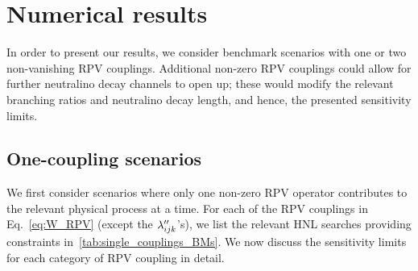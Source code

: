 \section{Numerical results}\label{sec:results}
In order to present our results, we consider benchmark scenarios with one or two non-vanishing RPV 
couplings. Additional non-zero RPV couplings could allow for further neutralino decay channels to 
open up; these would modify the relevant branching ratios and neutralino decay length, and hence, 
the presented sensitivity limits.



\subsection{One-coupling scenarios}
%
We first consider scenarios where only one non-zero RPV operator contributes to the relevant 
physical process at a time. For each of the RPV couplings in Eq.~\eqref{eq:W_RPV} (except the $\lambda''
_{ijk}$'s), we list the relevant HNL searches providing constraints in~\cref{tab:single_couplings_BMs}.
We now discuss the sensitivity limits for each category of RPV coupling in detail.

